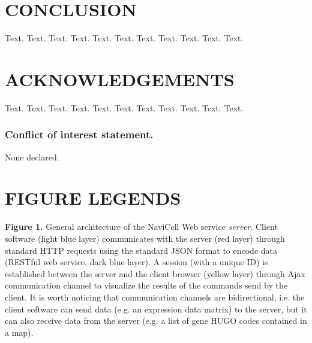 \documentclass[a4,center,fleqn]{NAR}
\begin{document}
\section{CONCLUSION}

Text. Text. Text. Text. Text. Text. Text. Text. Text. Text. Text.

\section{ACKNOWLEDGEMENTS}

Text. Text. Text. Text. Text. Text. Text. Text. Text. Text. Text.


\subsubsection{Conflict of interest statement.} None declared.
\newpage



\section{FIGURE LEGENDS}

\textbf{Figure 1.} General architecture of the NaviCell Web service
\emph{server}. Client software (light blue layer) communicates with the server
(red layer) through standard HTTP requests using the standard JSON format to
encode data (RESTful web service, dark blue layer). A session (with a unique ID)
is established between the server and the client browser (yellow layer) through
Ajax communication channel to visualize the results of the commands send by the
client. It is worth noticing that communication channels are bidirectional, i.e.
the client software can send data (e.g. an expression data matrix) to the
server, but it can also receive data from the server (e.g. a list of gene HUGO
codes contained in a map).
\end{document}

